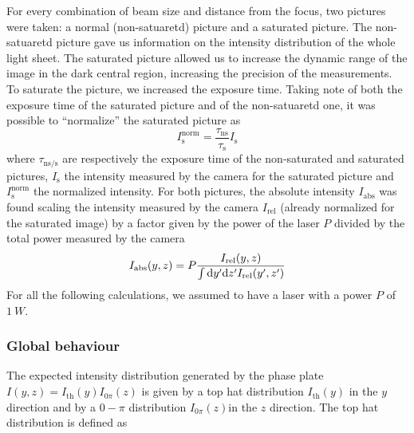 For every combination of beam size and distance from the focus, two pictures were taken: a normal (non-satuaretd) picture and a saturated picture. The non-satuaretd picture gave us information on the intensity distribution of the whole light sheet. The saturated picture allowed us to increase the dynamic range of the image in the dark central region, increasing the precision of the measurements.
To saturate the picture, we increased the exposure time. Taking note of both the exposure time of the saturated picture and of the non-satuaretd one, it was possible to \enquote{normalize} the saturated picture as
\begin{equation}
    I_\text{s}^\text{norm} = \frac{\tau_\text{ns}}{\tau_\text{s}} I_\text{s}
\end{equation}
where $\tau_\text{ns/s}$ are respectively the exposure time of the non-saturated and saturated pictures, $I_\text{s}$ the intensity measured by the camera for the saturated picture and $I_\text{s}^\text{norm}$ the normalized intensity.
For both pictures, the absolute intensity $I_\text{abs}$ was found scaling the intensity measured by the camera $I_\text{rel}$ (already normalized for the saturated image) by a factor given by the power of the laser $P$ divided by the total power measured by the camera
\begin{equation}
    I_\text{abs}(y,z) = P\frac{I_\text{rel}(y,z)}{
        \int \differential y' \differential z' I_\text{rel}(y',z')}
\end{equation}
For all the following calculations, we assumed to have a laser with a power $P$ of $\SI{1}{W}$.

\subsubsection{Global behaviour}
The expected intensity distribution generated by the phase plate $I(y,z) = I_\text{th}(y) I_{0\pi}(z)$ is given by a top hat distribution $I_\text{th}(y)$ in the $y$ direction and by a $0-\pi$ distribution $I_{0\pi}(z)$in the $z$ direction. The top hat distribution is defined as

